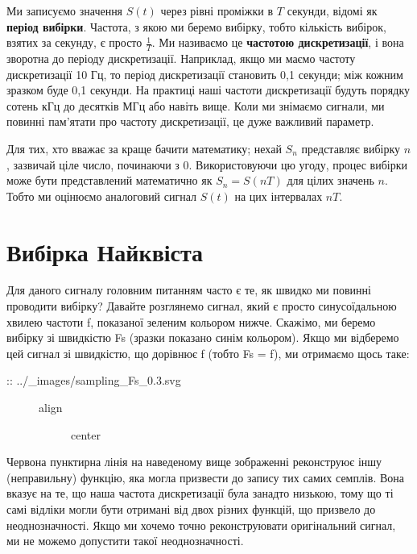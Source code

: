 \href{../_images/sampling.svg}{}

Ми записуємо значення \(S(t)\) через рівні проміжки в \(T\) секунди,
відомі як \textbf{період вибірки}. Частота, з якою ми беремо вибірку,
тобто кількість вибірок, взятих за секунду, є просто \(\frac{1}{T}\). Ми
називаємо це \textbf{частотою дискретизації}, і вона зворотна до періоду
дискретизації. Наприклад, якщо ми маємо частоту дискретизації 10 Гц, то
період дискретизації становить 0,1 секунди; між кожним зразком буде 0,1
секунди. На практиці наші частоти дискретизації будуть порядку сотень
кГц до десятків МГц або навіть вище. Коли ми знімаємо сигнали, ми
повинні пам'ятати про частоту дискретизації, це дуже важливий параметр.

Для тих, хто вважає за краще бачити математику; нехай \(S_n\)
представляє вибірку \(n\), зазвичай ціле число, починаючи з 0.
Використовуючи цю угоду, процес вибірки може бути представлений
математично як \(S_n = S(nT)\) для цілих значень \(n\). Тобто ми
оцінюємо аналоговий сигнал \(S(t)\) на цих інтервалах \(nT\).

\section{Вибірка
Найквіста}\label{ux432ux438ux431ux456ux440ux43aux430-ux43dux430ux439ux43aux432ux456ux441ux442ux430}

Для даного сигналу головним питанням часто є те, як швидко ми повинні
проводити вибірку? Давайте розглянемо сигнал, який є просто
синусоїдальною хвилею частоти f, показаної зеленим кольором нижче.
Скажімо, ми беремо вибірку зі швидкістю Fs (зразки показано синім
кольором). Якщо ми відберемо цей сигнал зі швидкістю, що дорівнює f
(тобто Fs = f), ми отримаємо щось таке:

\begin{description}
\item[:: ../\_images/sampling\_Fs\_0.3.svg]
\begin{description}
\item[align]
center
\end{description}
\end{description}

Червона пунктирна лінія на наведеному вище зображенні реконструює іншу
(неправильну) функцію, яка могла призвести до запису тих самих семплів.
Вона вказує на те, що наша частота дискретизації була занадто низькою,
тому що ті самі відліки могли бути отримані від двох різних функцій, що
призвело до неоднозначності. Якщо ми хочемо точно реконструювати
оригінальний сигнал, ми не можемо допустити такої неоднозначності.


